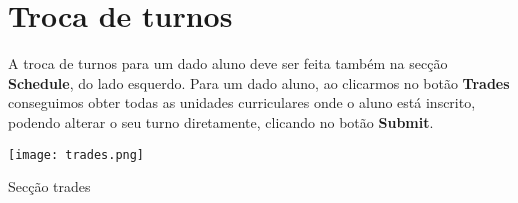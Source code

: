 \documentclass[11pt,a4paper]{report}
\begin{document}
    \pagebreak
    \chapter{Troca de turnos}
A troca de turnos para um dado aluno deve ser feita também na secção \textbf{Schedule}, do lado esquerdo. Para um dado aluno, ao clicarmos no botão \textbf{Trades} conseguimos obter todas as unidades curriculares onde o aluno está inscrito, podendo alterar o seu turno diretamente, clicando no botão \textbf{Submit}.

    \begin{center}
    \texttt{[image: trades.png]}
    \caption{Secção trades}
    \end{center}
    
\end{document}
